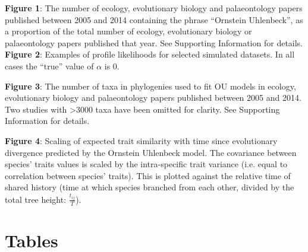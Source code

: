 \documentclass[a4paper,12pt]{article}
\begin{document}
\noindent
\textbf{Figure 1}: The number of ecology, evolutionary biology and palaeontology papers published between 2005 and 2014 containing the phrase ``Ornstein Uhlenbeck'', as a proportion of the total number of ecology, evolutionary biology or palaeontology papers published that year. See Supporting Information for details.\\

\noindent
\textbf{Figure 2}: Examples of profile likelihoods for selected simulated datasets. In all cases the ``true'' value of $\alpha$ is 0.

\noindent
\textbf{Figure 3}: The number of taxa in phylogenies used to fit OU models in ecology, evolutionary biology and palaeontology papers published between 2005 and 2014. Two studies with \textgreater 3000 taxa have been omitted for clarity. See Supporting Information for details.

\noindent
\textbf{Figure 4}: Scaling of expected trait similarity with time since evolutionary divergence predicted by the Ornstein Uhlenbeck model. The covariance between species' traits values is scaled by the intra-specific trait variance (i.e. equal to correlation between species' traits). This is plotted against the relative time of shared history (time at which species branched from each other, divided by the total tree height: $\frac{t_{ij}}{T}$).
      

\newpage
\section{Tables}
\end{document}
